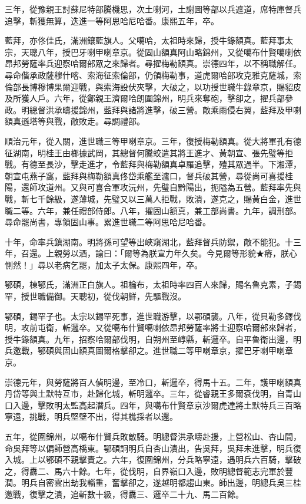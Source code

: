 \begin{pinyinscope}
三年，從豫親王討蘇尼特部騰機思，次土喇河，土謝圖等部以兵遮道，席特庫督兵追擊，斬獲無算，迭進一等阿思哈尼哈番。康熙五年，卒。

藍拜，亦佟佳氏，滿洲鑲藍旗人。父噶哈，太祖時來歸，授牛錄額真。藍拜事太宗，天聰八年，授巴牙喇甲喇章京。從固山額真阿山略錦州，又從噶布什賢噶喇依昂邦勞薩率兵迎察哈爾部眾之來歸者。尋擢梅勒額真。崇德四年，以不稱職解任。尋命偕承政薩穆什喀、索海征索倫部，仍領梅勒事，道虎爾哈部攻克雅克薩城，索倫部長博穆博果爾迎戰，與索海設伏夾擊，大破之，以功授世職牛錄章京，賜貂皮及所獲人戶。六年，從鄭親王濟爾哈朗圍錦州，明兵來奪砲，擊卻之，擢兵部參政。明總督洪承疇援錦州，藍拜與諸將進擊，破三營。敵乘雨侵右翼，藍拜及甲喇額真遜塔等與戰，敵敗走。尋調禮部。

順治元年，從入關，進世職三等甲喇章京。三年，復授梅勒額真。從大將軍孔有德征湖南，明桂王由榔據武岡，其總督何騰蛟遣其將王進才、黃朝宣、張先璧等拒戰。有德至長沙，擊走進才，令藍拜與梅勒額真卓羅追擊，殪其眾過半。下湘潭，朝宣屯燕子窩，藍拜與梅勒額真佟岱乘艦至瀘口，督兵破其營，尋從尚可喜援桂陽，還師攻道州。又與可喜合軍攻沅州，先璧自黔陽出，扼隘為五營。藍拜率先與戰，斬七千餘級，遂薄城，先璧又以三萬人拒戰，敗潰，遂克之，賜黃白金，進世職二等。六年，兼任禮部侍郎。八年，擢固山額真，兼工部尚書。九年，調刑部。尋命罷尚書，專領固山事。累進世職二等阿思哈尼哈番。

十年，命率兵鎮湖南。明將孫可望等出峽窺湖北，藍拜督兵防禦，敵不能犯。十三年，召還。上親勞以酒，諭曰：「爾等為朕宣力年久矣。今見爾等形貌★瘠，朕心惻然！」尋以老病乞罷，加太子太保。康熙四年，卒。

鄂碩，棟鄂氏，滿洲正白旗人。祖棆布，太祖時率四百人來歸，賜名魯克素，子錫罕，授世職備御。天聰初，從伐朝鮮，先驅戰沒。

鄂碩，錫罕子也。太宗以錫罕死事，進世職游擊，以鄂碩襲。八年，從貝勒多鐸伐明，攻前屯衛，斬邏卒。又從噶布什賢噶喇依昂邦勞薩率將士迎察哈爾部來歸者，授牛錄額真。九年，招察哈爾部伐明，自朔州至崞縣，斬邏卒。自平魯衛出邊，明兵邀戰，鄂碩與固山額真圖爾格擊卻之。進世職二等甲喇章京，擢巴牙喇甲喇章京。

崇德元年，與勞薩將百人偵明邊，至冷口，斬邏卒，得馬十五。二年，護甲喇額真丹岱等與土默特互市，赴歸化城，斬明邏卒。三年，從睿親王多爾袞伐明，自青山口入邊，擊敗明太監高起潛兵。四年，與噶布什賢章京沙爾虎達將土默特兵三百略寧遠，挑戰，明兵堅壁不出，得其樵採者以還。

五年，從圍錦州，以噶布什賢兵敗敵騎。明總督洪承疇赴援，上營松山、杏山間，命吳拜等以偏師營高橋東。鄂碩詗明兵自杏山潰出，告吳拜，吳拜未進擊，明兵復入城。上以鄂碩不親擊責之。六年，復圍錦州，分兵略寧遠，遇明兵六百騎，擊破之，得纛二、馬六十餘。七年，從伐明，自界嶺口入邊，敗明總督範志完軍於豐潤。明兵自密雲出劫我輜重，奮擊卻之，遂越明都趨山東。師出邊，明總兵吳三桂邀戰，復擊之潰，追斬數十級，得纛三、邏卒二十九、馬二百餘。


\end{pinyinscope}
